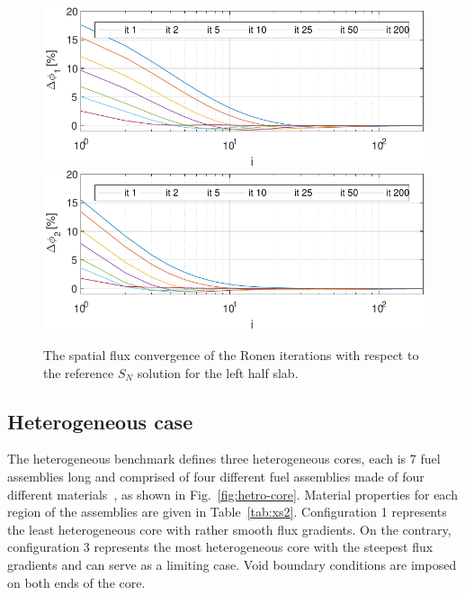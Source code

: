 \begin{figure}[htbp!]
	\centering
	\includegraphics[width=0.45\linewidth]{flux_deviation_half_it_1_sn.pdf}
	\includegraphics[width=0.45\linewidth]{flux_deviation_half_it_2_sn.pdf}
	\caption{The spatial flux convergence of the Ronen iterations with respect to the reference $S_N$ solution for the left half slab.}
	\label{fig:conv3}
\end{figure}


%
\subsection{Heterogeneous case}
\label{subsec:heterog}

The heterogeneous benchmark defines three heterogeneous cores, each is 7 fuel assemblies long and comprised of four different fuel assemblies made of four different materials~\cite{Rahnema-1997}, as shown in Fig.~\ref{fig:hetro-core}. Material properties for each region of the assemblies are given in
Table~\ref{tab:xs2}. Configuration 1 represents the least heterogeneous core with rather smooth flux gradients. On the contrary, configuration 3 represents the most heterogeneous core with the steepest flux gradients and can serve as a limiting case. Void boundary conditions are imposed on both ends of the core. 

